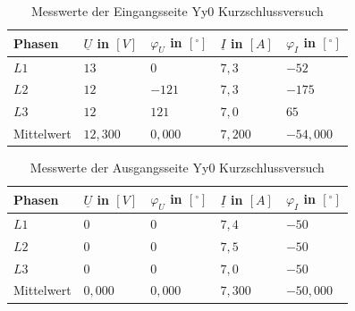 \begin{enumerate}[label=\alph*)]
        \begin{table}[h!]
          \caption{Messwerte der Eingangsseite Yy0 Kurzschlussversuch}
          \centering
          \begin{tabular}{lllll}
            \\ \hline
            Phasen     & $\underline{U}$ in $[V]$ & $\varphi_{U}$ in $[^\circ]$ & $\underline{I}$ in $[A]$ & $\varphi_{I}$ in $[^\circ]$ \\ \hline
            $L1$       & $13$                     & $0$                         & $7,3$                    & $-52$                       \\
            $L2$       & $12$                     & $-121$                      & $7,3$                    & $-175$                      \\
            $L3$       & $12$                     & $121$                       & $7,0$                    & $65$                        \\ \hline
            Mittelwert & $12,300$                 & $0,000$                     & $7,200$                  & $-54,000$                   \\ \hline\hline
          \end{tabular}
        \end{table}
        \begin{table}[h!]
          \centering
          \caption{Messwerte der Ausgangsseite Yy0 Kurzschlussversuch}
          \begin{tabular}{lllll}
            \\ \hline
            Phasen     & $\underline{U}$ in $[V]$ & $\varphi_{U}$ in $[^\circ]$ & $\underline{I}$ in $[A]$ & $\varphi_{I}$ in $[^\circ]$ \\ \hline
            $L1$       & $0$                      & $0$                         & $7,4$                    & $-50$                       \\
            $L2$       & $0$                      & $0$                         & $7,5$                    & $-50$                       \\
            $L3$       & $0$                      & $0$                         & $7,0$                    & $-50$                       \\ \hline
            Mittelwert & $0,000$                  & $0,000$                     & $7,300$                  & $-50,000$                   \\ \hline\hline
          \end{tabular}
        \end{table}
\end{enumerate}

